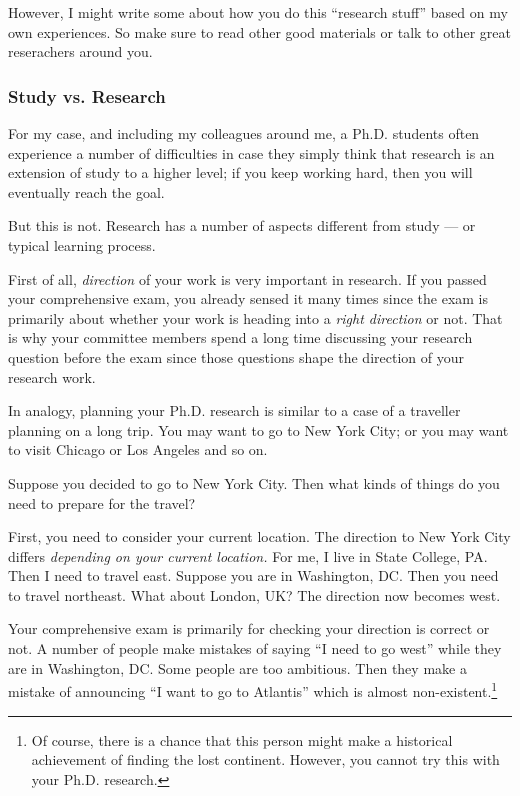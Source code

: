 \documentclass[11pt]{article}
\begin{document}
However, I might write some about how you do this ``research stuff'' based on
my own experiences. So make sure to read other good materials or talk to other
great reserachers around you.

\subsubsection{Study vs. Research}

For my case, and including my colleagues around me, a Ph.D. students often
experience a number of difficulties in case they simply think that research is
an extension of study to a higher level; if you keep working hard, then you
will eventually reach the goal.

But this is not. Research has a number of aspects different from study --- or
typical learning process.

First of all, \emph{direction} of your work is very important in research. If
you passed your comprehensive exam, you already sensed it many times since the
exam is primarily about whether your work is heading into a \emph{right
direction} or not. That is why your committee members spend a long time
discussing your research question before the exam since those questions shape
the direction of your research work. 

In analogy, planning your Ph.D. research is similar to a case of a traveller
planning on a long trip. You may want to go to New York City; or you may want
to visit Chicago or Los Angeles and so on. 

Suppose you decided to go to New York City. Then what kinds of things do you
need to prepare for the travel?

First, you need to consider your current location. The direction to New York
City differs \emph{depending on your current location.} For me, I live in
State College, PA. Then I need to travel east. Suppose you are in Washington,
DC. Then you need to travel northeast. What about London, UK? The direction
now becomes west.

Your comprehensive exam is primarily for checking your direction is correct or
not. A number of people make mistakes of saying ``I need to go west'' while
they are in Washington, DC. Some people are too ambitious. Then they make a
mistake of announcing ``I want to go to Atlantis'' which is almost
non-existent.\footnote{Of course, there is a chance that this person might
make a historical achievement of finding the lost continent.  However, you
cannot try this with your Ph.D. research.}
\end{document}
